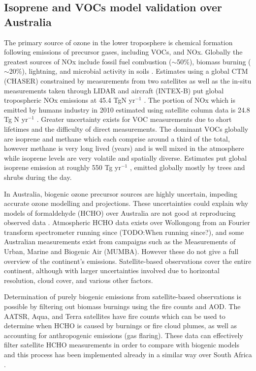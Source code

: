 \subsection{Isoprene and VOCs model validation over Australia}
The primary source of ozone in the lower troposphere is chemical formation following emissions of precursor gases, including VOCs, and NOx.
Globally the greatest sources of NOx include fossil fuel combustion ($\sim$50\%), biomass burning ($\sim$20\%), lightning, and microbial activity in soils \citep{Delmas_1997}.
Estimates using a global CTM (CHASER) constrained by measurements from two satellites as well as the in-situ measurements taken through LIDAR and aircraft (INTEX-B) put global tropospheric NOx emissions at 45.4 TgN yr$^{-1}$ \cite{Miyazaki_2011}.
The portion of NOx which is emitted by humans industry in 2010 estimated using satellite column data is 24.8 Tg N yr$^{-1}$ \cite{Streets_2013}.
Greater uncertainty exists for VOC measurements due to short lifetimes and the difficulty of direct measurements.
The dominant VOCs globally are isoprene and methane which each comprise around a third of the total, however methane is very long lived (years) and is well mixed in the atmosphere while isoprene levels are very volatile and spatially diverse.
Estimates put global isoprene emission at roughly 550 Tg yr$^{-1}$ \cite{Guenther_2006, Monks_2014}, emitted globally mostly by trees and shrubs during the day.

In Australia, biogenic ozone precursor sources are highly uncertain, impeding accurate ozone modelling and projections. These uncertainties could explain why models of formaldehyde (HCHO) over Australia are not good at reproducing observed data \cite{Stavrakou_2009}. Atmospheric HCHO data exists over Wollongong from an Fourier transform spectrometer running since (TODO:When running since?), and some Australian measurements exist from campaigns such as the Measurements of Urban, Marine and Biogenic Air (MUMBA).
However these do not give a full overview of the continent's emissions. Satellite-based observations cover the entire continent, although with larger uncertainties involved due to horizontal resolution, cloud cover, and various other factors. 

Determination of purely biogenic emissions from satellite-based observations is possible by filtering out biomass burnings using the fire counts and AOD.
The AATSR, Aqua, and Terra satellites have fire counts which can be used to determine when HCHO is caused by burnings or fire cloud plumes, as well as accounting for anthropogenic emissions (gas flaring).
These data can effectively filter satellite HCHO measurements in order to compare with biogenic models and this process has been implemented already in a similar way over South Africa \cite{Marais_2012}.


